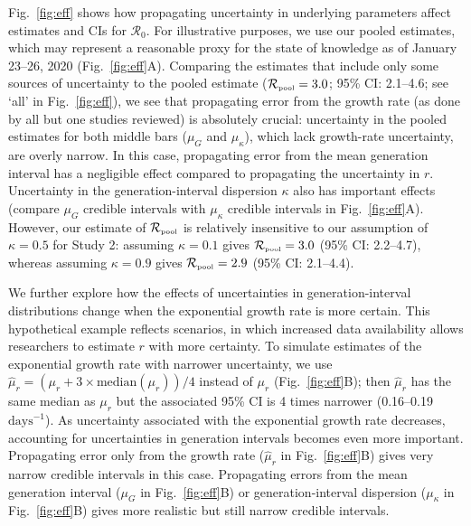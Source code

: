 \documentclass[12pt]{article}
\newcommand{\fref}[1]{Fig.~\ref{fig:#1}}
\newcommand{\Ro}{\ensuremath{{\mathcal R}_{0}}\xspace}
\newcommand{\Rpool}{\ensuremath{{\mathcal R}_{\textrm{\tiny{pool}}}}\xspace}
\begin{document}
\fref{eff} shows how propagating uncertainty in underlying parameters affect estimates and CIs for \Ro. 
For illustrative purposes, we use our pooled estimates, which may represent a reasonable proxy for the state of knowledge as of January 23--26, 2020 (\fref{eff}A).
Comparing the estimates that include only some sources of uncertainty to the pooled estimate ($\Rpool = 3.0$; 95\% CI: 2.1--4.6; see `all' in \fref{eff}), we see that propagating error from the growth rate (as done by all but one studies reviewed) is absolutely crucial: uncertainty in the pooled estimates for both middle bars ($\mu_G$ and $\mu_\kappa$), which lack growth-rate uncertainty, are overly narrow.
In this case, propagating error from the mean generation interval has a negligible effect compared to propagating the uncertainty in $r$.
Uncertainty in the generation-interval dispersion $\kappa$ also has important effects (compare $\mu_G$ credible intervals with $\mu_\kappa$ credible intervals in \fref{eff}A).
However, our estimate of \Rpool is relatively insensitive to our assumption of $\kappa=0.5$ for Study 2: assuming $\kappa=0.1$ gives $\Rpool = 3.0$ (95\% CI: 2.2--4.7), whereas assuming $\kappa=0.9$ gives $\Rpool = 2.9$ (95\% CI: 2.1--4.4).

We further explore how the effects of uncertainties in generation-interval distributions change when the exponential growth rate is more certain.
This hypothetical example reflects scenarios, in which increased data availability allows researchers to estimate $r$ with more certainty.
To simulate estimates of the exponential growth rate with narrower uncertainty, we use $\hat{\mu}_r = (\mu_r + 3\times\mathrm{median}(\mu_r))/4$ instead of $\mu_r$ (\fref{eff}B); 
then $\hat{\mu}_r$ has the same median as $\mu_r$ but the associated 95\% CI is 4 times narrower (0.16--0.19 $\textrm{days}^{-1}$).
As uncertainty associated with the exponential growth rate decreases, accounting for uncertainties in generation intervals becomes even more important.
Propagating error only from the growth rate ($\hat{\mu}_r$ in \fref{eff}B) gives very narrow credible intervals in this case. 
Propagating errors from the mean generation interval ($\mu_G$ in \fref{eff}B) or generation-interval dispersion ($\mu_\kappa$ in \fref{eff}B) gives more realistic but still narrow credible intervals.
\end{document}

